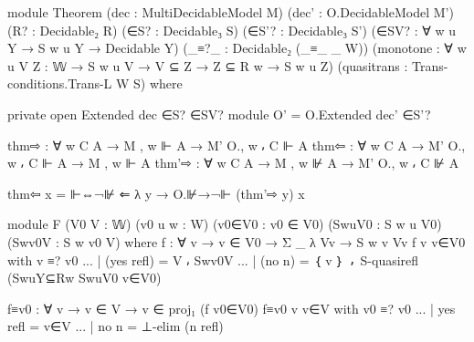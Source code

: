 \begin{spverbatim}
  module Theorem
    (dec : MultiDecidableModel M)
    (dec' : O.DecidableModel M')
    (R? : Decidable₂ R)
    (∈S? : Decidable₃ S)
    (∈S'? : Decidable₃ S')
    (∈SV? : ∀ {w u Y} → S w u Y → Decidable Y)
    (_≡?_ : Decidable₂ (_≡_ {_} {W}))
    (monotone : ∀ {w u} {V Z : 𝕎} → S w u V → V ⊆ Z → Z ⊆ R w → S w u Z)
    (quasitrans : Trans-conditions.Trans-L W S)
    where

    private
      open Extended dec ∈S? ∈SV?
      module O' = O.Extended dec' ∈S'?

      thm⇨ : ∀ {w C A} → M , w ⊩ A → M' O., w ⸴ C ⊩ A
      thm⇦ : ∀ {w C A} → M' O., w ⸴ C ⊩ A → M , w ⊩ A
      thm'⇨ : ∀ {w C A} → M , w ⊮ A → M' O., w ⸴ C ⊮ A

      thm⇦ x = ⊩⇔¬⊮ ⇐ λ {y → O.⊮→¬⊩ (thm'⇨ y) x}

      module F
        (V0 V : 𝕎)
        (v0 u w : W)
        (v0∈V0 : v0 ∈ V0)
        (SwuV0 : S w u V0)
        (Swv0V : S w v0 V)
        where
        f : ∀ {v} → v ∈ V0 → Σ _ λ Vv → S w v Vv
        f {v} v∈V0 with v ≡? v0
        ... | (yes refl) = V ⸴ Swv0V
        ... | (no n) = ｛ v ｝ ⸴ S-quasirefl (SwuY⊆Rw SwuV0 v∈V0)

        f≡v0 : ∀ {v} → v ∈ V → v ∈ proj₁ (f v0∈V0)
        f≡v0 {v} v∈V with v0 ≡? v0
        ... | yes refl = v∈V
        ... | no n = ⊥-elim (n refl)


\end{spverbatim}
